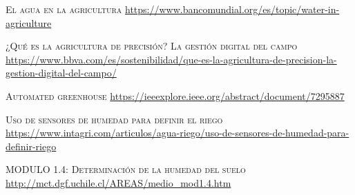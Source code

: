 \documentclass[a4paper, 12pt, oneside]{book}
\begin{document}
\begin{thebibliography}{X}
\textsc{El agua en la agricultura}
\url{https://www.bancomundial.org/es/topic/water-in-agriculture}

\textsc{¿Qué es la agricultura de precisión? La gestión digital del campo}
\url{https://www.bbva.com/es/sostenibilidad/que-es-la-agricultura-de-precision-la-gestion-digital-del-campo/}

\textsc{Automated greenhouse}
\url{https://ieeexplore.ieee.org/abstract/document/7295887}

\textsc{Uso de sensores de humedad para definir el riego}
\url{https://www.intagri.com/articulos/agua-riego/uso-de-sensores-de-humedad-para-definir-riego}

\textsc{ MODULO 1.4: Determinación de la humedad del suelo}
\url{http://mct.dgf.uchile.cl/AREAS/medio_mod1.4.htm}

\end{thebibliography}
\end{document}
